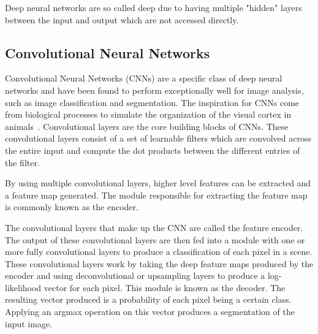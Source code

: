 Deep neural networks are so called deep due to having multiple "hidden" layers between the input and output which are not accessed directly.

\subsection{Convolutional Neural Networks}\label{section:background-cnn}
Convolutional Neural Networks (CNNs) are a specific class of deep neural networks and have been found to perform exceptionally well for image analysis, such as image classification and segmentation.
The inspiration for CNNs come from biological processes to simulate the organization of the visual cortex in animals~\cite{cnnbiology}.
Convolutional layers are the core building blocks of CNNs.
These convolutional layers consist of a set of learnable filters which are convolved across the entire input and compute the dot products between the different entries of the filter.



By using multiple convolutional layers, higher level features can be extracted and a feature map generated.
The module responsible for extracting the feature map is commonly known as the encoder.

The convolutional layers that make up the CNN are called the feature encoder.
The output of these convolutional layers are then fed into a module with one or more fully convolutional layers to produce a classification of each pixel in a scene.
These convolutional layers work by taking the deep feature maps produced by the encoder and using deconvolutional or upsampling layers to produce a log-likelihood vector for each pixel.
This module is known as the decoder.
The resulting vector produced is a probability of each pixel being a certain class.
Applying an argmax operation on this vector produces a segmentation of the input image.
